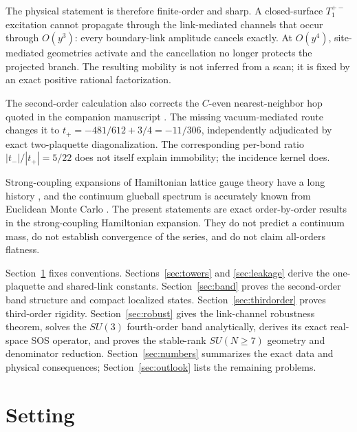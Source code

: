 \documentclass[11pt]{article}
\begin{document}
The physical statement is therefore finite-order and sharp. A closed-surface
$T_1^{+-}$ excitation cannot propagate through the link-mediated channels
that occur through $O(y^3)$: every boundary-link amplitude cancels exactly.
At $O(y^4)$, site-mediated geometries activate and the cancellation no longer
protects the projected branch. The resulting mobility is not inferred from a
scan; it is fixed by an exact positive rational factorization.

The second-order calculation also corrects the $C$-even nearest-neighbor hop
quoted in the companion manuscript \cite{companion}. The missing
vacuum-mediated route changes it to
$t_+=-481/612+3/4=-11/306$, independently adjudicated by exact
two-plaquette diagonalization. The corresponding per-bond ratio
$|t_-|/|t_+|=5/22$ does not itself explain immobility; the incidence kernel
does.

Strong-coupling expansions of Hamiltonian lattice gauge theory have a long
history \cite{KogutSusskind1975,Banksetal1977,KogutSinclairSusskind1976,
Creutz1983}, and the continuum glueball spectrum is accurately known from
Euclidean Monte Carlo \cite{MorningstarPeardon1999,AthenodorouTeper2020}.
The present statements are exact order-by-order results in the
strong-coupling Hamiltonian expansion. They do not predict a continuum mass,
do not establish convergence of the series, and do not claim all-orders
flatness.

Section~\ref{sec:setting} fixes conventions. Sections~\ref{sec:towers} and
\ref{sec:leakage} derive the one-plaquette and shared-link constants.
Section~\ref{sec:band} proves the second-order band structure and compact
localized states. Section~\ref{sec:thirdorder} proves third-order rigidity.
Section~\ref{sec:robust} gives the link-channel robustness theorem, solves the
$SU(3)$ fourth-order band analytically, derives its exact real-space SOS
operator, and proves the stable-rank
$SU(N\geq7)$ geometry and denominator reduction. Section~\ref{sec:numbers}
summarizes the exact data and physical consequences; Section~\ref{sec:outlook}
lists the remaining problems.

\section{Setting}
\label{sec:setting}
\end{document}
